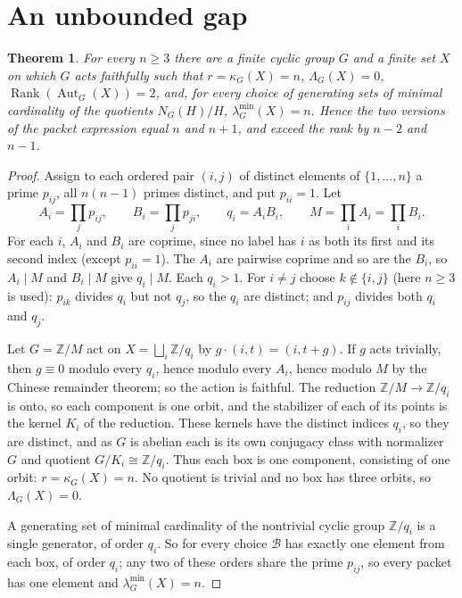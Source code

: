 \documentclass[11pt]{article}
\newtheorem{theorem}{Theorem}
\theoremstyle{remark}
\newcommand{\Rank}{\operatorname{Rank}}
\newcommand{\Aut}{\operatorname{Aut}}
\newcommand{\lmin}{\lambda^{\min}}
\begin{document}
\section{An unbounded gap}\label{sec:gap}

\begin{theorem}\label{thm:gap}
For every $n\ge3$ there are a finite cyclic group $G$ and a finite set $X$ on
which $G$ acts faithfully such that $r=\kappa_G(X)=n$, $\Lambda_G(X)=0$,
$\Rank(\Aut_G(X))=2$, and, for every choice of generating sets of minimal
cardinality of the quotients $N_G(H)/H$, $\lmin_G(X)=n$. Hence the two versions of the packet
expression equal $n$ and $n+1$, and exceed the rank by $n-2$ and $n-1$.
\end{theorem}

\begin{proof}
Assign to each ordered pair $(i,j)$ of distinct elements of
$\{1,\dots,n\}$ a prime $p_{ij}$, all $n(n-1)$ primes distinct, and put
$p_{ii}=1$. Let
\[
A_i=\prod_{j}p_{ij},\qquad B_i=\prod_{j}p_{ji},\qquad q_i=A_iB_i,\qquad
M=\prod_iA_i=\prod_iB_i .
\]
For each $i$, $A_i$ and $B_i$ are coprime, since no label has $i$ as both its
first and its second index (except $p_{ii}=1$). The $A_i$ are pairwise coprime
and so are the $B_i$, so $A_i\mid M$ and $B_i\mid M$ give $q_i\mid M$. Each
$q_i>1$. For $i\ne j$ choose $k\notin\{i,j\}$ (here $n\ge3$ is used): $p_{ik}$
divides $q_i$ but not $q_j$, so the $q_i$ are distinct; and $p_{ij}$ divides
both $q_i$ and $q_j$.

Let $G=\mathbb Z/M$ act on $X=\bigsqcup_{i}\mathbb Z/q_i$ by
$g\cdot(i,t)=(i,t+g)$. If $g$ acts trivially, then $g\equiv0$ modulo every
$q_i$, hence modulo every $A_i$, hence modulo $M$ by the Chinese remainder
theorem; so the action is faithful. The reduction $\mathbb Z/M\to\mathbb Z/q_i$
is onto, so each component is one orbit, and the stabilizer of each of its
points is the kernel $K_i$ of the reduction. These kernels have the distinct
indices $q_i$, so they are distinct, and as $G$ is abelian each is its own
conjugacy class with normalizer $G$ and quotient $G/K_i\cong\mathbb Z/q_i$.
Thus each box is one component, consisting of one orbit: $r=\kappa_G(X)=n$.
No quotient is trivial and no box has three orbits, so $\Lambda_G(X)=0$.

A generating set of minimal cardinality of the nontrivial cyclic group
$\mathbb Z/q_i$ is a single generator, of order $q_i$. So for every choice $\mathcal B$ has
exactly one element from each box, of order $q_i$; any two of these orders
share the prime $p_{ij}$, so every packet has one element and
$\lmin_G(X)=n$.


\end{proof}
\end{document}
